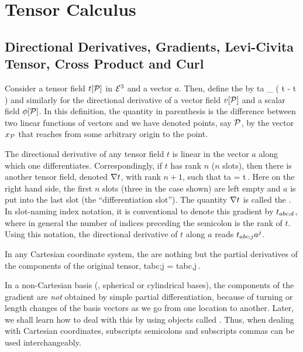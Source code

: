 \section{Tensor Calculus}

\subsection{Directional Derivatives, Gradients, Levi-Civita Tensor, Cross Product and Curl}
Consider a tensor field $t\!\left[{\mathcal{P}}\right]$ in $\mathcal{E}^{3}$ and a vector $a$. Then, define the  by
\beq
\dder ta  \lim_{\epsilon{}}
                \left( t - t \right)
\eeq
and similarly for the directional derivative of a vector field $v\!\left[{\mathcal{P}}\right]$ and a scalar field $\phi\!\left[{\mathcal{P}}\right]$. In this definition, the quantity in parenthesis is the difference between two linear functions of vectors and we have denoted points, say $\mathcal{P}$, by the vector $x_{\mathcal{P}}$ that reaches from some arbitrary origin to the point.

The directional derivative of any tensor field $t$ is linear in the vector $a$ along which one differentiates. Correspondingly, if $t$ has rank $n$ ($n$ slots), then there is another tensor field, denoted $\nabla t$, with rank $n+1$, such that
\beq
\dder ta = \gder t\,.
\eeq
Here on the right hand side, the first $n$ slots (three in the case shown) are left empty and $a$ is put into the last slot (the ``differentiation slot''). The quantity $\nabla t$ is called the . In slot-naming index notation, it is conventional to denote this gradient by ${t}_{abc;d}$, where in general the number of indices preceding the semicolon is the rank of $t$. Using this notation, the directional derivative of $t$ along $a$ reads ${t}_{abc;j}{a}^{j}$.

In any Cartesian coordinate system, the  are nothing but the partial derivatives of the components of the original tensor,
\beq
\cotens t{abc;j} =   \cotens t{abc,j}\,.
\eeq

In a non-Cartesian basis (\eg, spherical or cylindrical bases), the components of the gradient are \emph{not} obtained by simple partial differentiation, because of turning or length changes of the basis vectors as we go from one location to another. Later, we shall learn how to deal with this by using objects called . Thus, when dealing with Cartesian coordinates, subscripts semicolons and subscripts commas can be used interchangeably.

